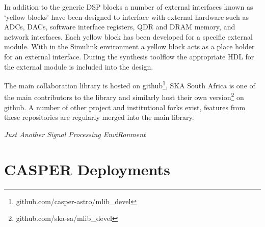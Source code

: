 \documentclass{ws-jai}
\begin{document}
In addition to the generic DSP blocks a number of external interfaces known as
`yellow blocks' have been designed to interface with external hardware such as
ADCs, DACs, software interface registers, QDR and DRAM memory, and network
interfaces. Each yellow block has been developed for a specific external module.
With in the Simulink environment a yellow block acts as a place holder for an
external interface. During the synthesis toolflow the appropriate HDL for the
external module is included into the design.

The main collaboration library is hosted on
github\footnote{github.com/casper-astro/mlib\_devel}, SKA South Africa
is one of the main contributors to the library and similarly host their own
version\footnote{github.com/ska-sa/mlib\_devel} on github. A number of
other project and institutional forks exist, features from these repositories
are regularly merged into the main library.

\emph{Just Another Signal Processing EnviRonment}


\section{CASPER Deployments} \label{sec:Deployments}
\end{document}
